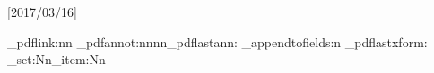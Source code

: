 %
%
%
%
%
%
%
%
%
%
%
\usepackage{pdfbase}[2017/03/16]
\usepackage{xparse,ocgbase}
\usepackage{xcolor,calc}
\usepackage{tikzpagenodes,linegoal}
\usetikzlibrary{calc}

\ExplSyntaxOn
\let\tpPdfLink\pbs_pdflink:nn
\let\tpPdfAnnot\pbs_pdfannot:nnnn\let\tpPdfLastAnn\pbs_pdflastann:
\let\tpAppendToFields\pbs_appendtofields:n
\def\tpPdfXform{\pbs_pdfxform:nnnnn{1}{1}{}{}}
\let\tpPdfLastXform\pbs_pdflastxform:
\let\cListSet\clist_set:Nn\let\cListItem\clist_item:Nn
\ExplSyntaxOff

